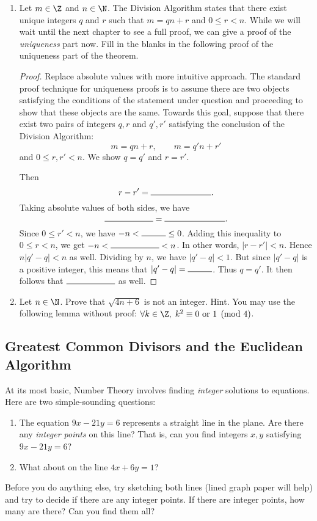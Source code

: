 \begin{enumerate}
    \item Let $m \in \Z$ and $n \in \N$. The Division Algorithm states that there exist unique integers $q$ and $r$ such that $m = qn + r$ and $0 \leq r < n$. While we will wait until the next chapter to see a full proof, we can give a proof of the \emph{uniqueness} part now. Fill in the blanks in the following proof of the uniqueness part of the theorem.
    
    \begin{proof}
        Replace absolute values with more intuitive approach.
        The standard proof technique for uniqueness proofs is to assume there are two objects satisfying the conditions of the statement under question and proceeding to show that these objects are the same. Towards this goal, suppose that there exist two pairs of integers $q,r$ and $q',r'$ satisfying the conclusion of the Division Algorithm:
        \[
            m = qn + r, \qquad m = q'n + r'
        \]
        and $0 \leq r,r' < n$. We show $q = q'$ and $r = r'$.
        
        Then
        \[
          r - r' = \rule{2.5cm}{0.15mm}.  
        \]
        Taking absolute values of both sides, we have
        \[
            \rule{2cm}{0.15mm} = \rule{2.5cm}{0.15mm}.
        \]
        Since $0 \leq r' < n$, we have $-n < \rule{1cm}{0.15mm} \leq 0$. Adding this inequality to $0 \leq r < n$, we get $-n < \rule{2cm}{0.15mm} < n$. In other words, $|r - r'| < n$. Hence $n|q'-q| < n$ as well. Dividing by $n$, we have $|q' - q| < 1$. But since $|q' - q|$ is a positive integer, this means that $|q' - q| = \rule{1cm}{0.15mm}$. Thus $q = q'$. It then follows that $\rule{2cm}{0.15mm}$ as well.
    \end{proof}


\item Let $n \in \N$.  Prove that $\sqrt{4n+6}$ is not an integer.  Hint.  You may use the following lemma without proof: $\forall k \in \Z,\; k^2 \equiv 0 \text{ or } 1 \pmod 4$.



    
\end{enumerate}\newpage

\subsection{Greatest Common Divisors and the Euclidean Algorithm}

At its most basic, Number Theory involves finding \emph{integer} solutions to equations. Here are two simple-sounding questions:
\begin{enumerate}
  \item The equation $9x-21y=6$ represents a straight line in the plane. Are there any \emph{integer points} on this line? That is, can you find integers $x,y$ satisfying $9x-21y=6$?
  \item What about on the line $4x+6y=1$?
\end{enumerate}
Before you do anything else, try sketching both lines (lined graph paper will help) and try to decide if there are any integer points. If there are integer points, how many are there? Can you find them all?\\

